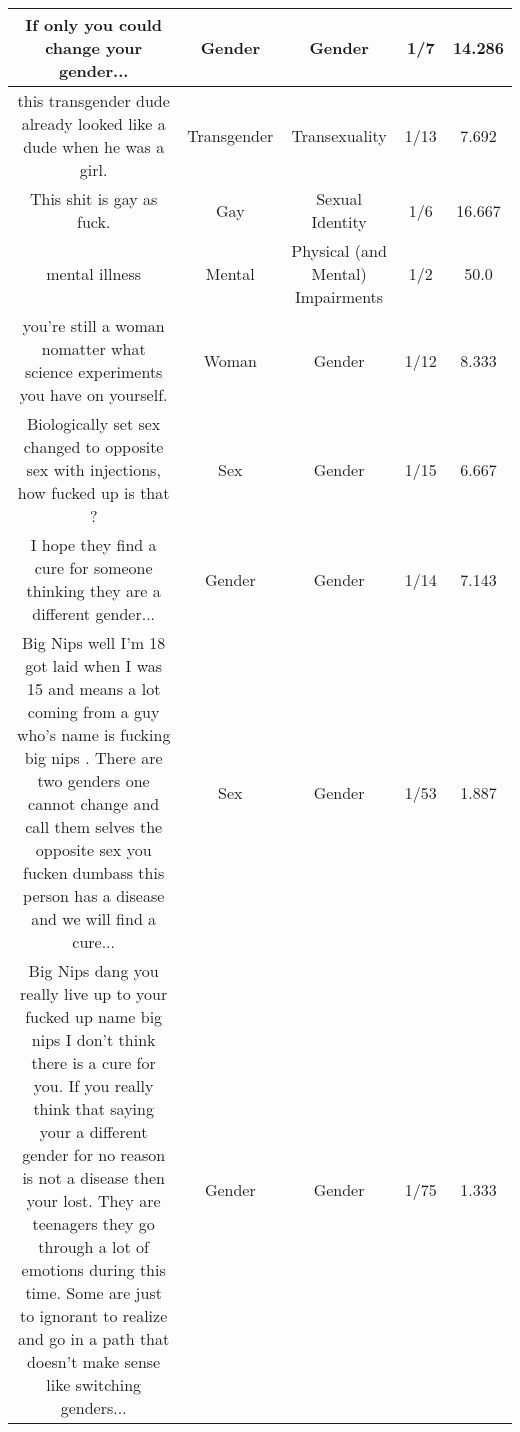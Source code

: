 \documentclass[11pt]{article}
\newlength\mylength
\begin{document}
\begin{center}
\begin{longtable}{|C{.40\mylength}|C{.30\mylength}|C{.15\mylength}|C{.15\mylength}|C{.15\mylength}|}
  If only you could change your gender...  & Gender & Gender & 1/7 & 14.286 \\  \hline
  this transgender dude already looked like a dude when he was a girl.  & Transgender & Transexuality & 1/13 & 7.692 \\  \hline
  This shit is gay as fuck.  & Gay & Sexual Identity & 1/6 & 16.667 \\  \hline
  mental illness  & Mental & Physical (and Mental) Impairments & 1/2 & 50.0 \\  \hline
  you're still a woman nomatter what science experiments you have on yourself.  & Woman & Gender & 1/12 & 8.333 \\  \hline
  Biologically set sex changed to opposite sex with injections, how fucked up is that ?  & Sex & Gender & 1/15 & 6.667 \\  \hline
  I hope they find a cure for someone thinking they are a different gender...  & Gender & Gender & 1/14 & 7.143 \\  \hline
  Big Nips well I'm 18 got laid when I was 15 and means a lot coming from a guy who's name is fucking  big nips . There are two genders one cannot change and call them selves the opposite sex you fucken dumbass this person has a disease and we will find a cure...  & Sex & Gender & 1/53 & 1.887 \\  \hline
  Big Nips dang you really live up to your fucked up name  big nips  I don't think there is a cure for you. If you really think that saying your a different gender for no reason is not a disease then your lost. They are teenagers they go through a lot of emotions during this time. Some are just to ignorant to realize and go in a path that doesn't make sense like switching genders...  & Gender & Gender & 1/75 & 1.333 \\  \hline

\end{longtable}
\end{center}
\end{document}
